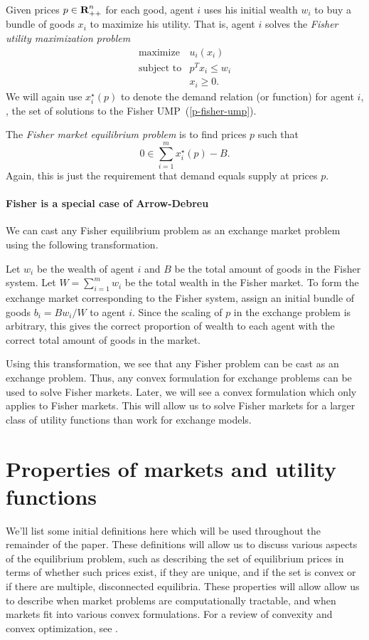 \documentclass[12pt]{article}
\begin{document}
Given prices $p \in {\mbox{\bf R}}^n_{++}$ for each good, agent $i$ uses his initial
wealth $w_i$ to buy a bundle of goods $x_i$ to maximize his utility.
That is, agent $i$ solves the \emph{Fisher utility maximization problem}
\begin{equation}
\label{p-fisher-ump}
\begin{array}{ll}
\mbox{maximize} & u_i(x_i) \\
\mbox{subject to} & p^T x_i \leq w_i \\
& x_i \geq 0.
\end{array}
\end{equation}
We will again use $x^\star_i(p)$ to denote the demand relation (or function)
for agent $i$, \ie, the set of solutions to the Fisher UMP~(\ref{p-fisher-ump}).

The \emph{Fisher market equilibrium problem} is to find prices $p$ such that
\[
0 \in \sum_{i=1}^m x^\star_{i}(p) - B.
\]
Again, this is just the requirement that demand equals supply
at prices $p$.

\paragraph{Fisher is a special case of Arrow-Debreu}
We can cast any Fisher equilibrium problem as an exchange market problem using the following transformation.

Let $w_i$ be the wealth of agent $i$ and $B$ be the total amount of goods in
the Fisher system.
Let $W = \sum_{i=1}^m w_i$ be the total wealth in the Fisher market.
To form the exchange market corresponding to the Fisher system, assign an initial bundle of goods
$b_i = B w_i/W$ to agent $i$.
Since the scaling of $p$ in the exchange problem is arbitrary,
this gives the correct proportion of wealth to each agent with the correct
total amount of goods in the market.

Using this transformation, we see that any Fisher problem can be cast as an
exchange problem. Thus, any convex formulation for exchange problems can be
used to solve Fisher markets. Later, we will see a convex formulation
which only applies to Fisher markets. This will allow us to solve
Fisher markets for a larger class of utility functions than work for
exchange models.

\section{Properties of markets and utility functions}
We'll list some initial definitions here which will be used throughout the remainder of the paper.
These definitions will allow us to discuss various aspects of the
equilibrium problem, such as describing the set of equilibrium prices
in terms of whether such prices exist, if they are unique, and if the set is convex or if there are multiple, disconnected equilibria.
These properties will allow allow us to describe when market problems
are computationally tractable, and when markets fit into
various convex formulations.
For a review of convexity and convex optimization, see
\cite{boyd2009convex}.
\end{document}
